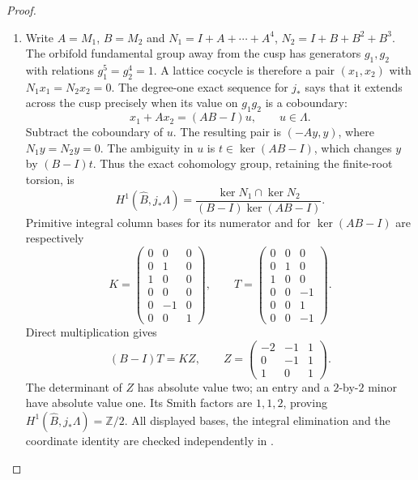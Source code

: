 \documentclass[11pt,a4paper]{article}
\theoremstyle{definition}
\begin{document}
\begin{proof}
\begin{enumerate}[label=\arabic*.]
To check the last surjectivity at the cusp, lift a translation
to the toroidal cover. It preserves the fan precisely when
its valuation is an integral translation of the periodic
fan. Subtract the corresponding period; the remaining
characters are nonvanishing holomorphic functions on a
disc and possess logarithms. These give a local section
of $E_0$. The kernel consists exactly of the invariant
integral periods. This also proves that the sequence
accounts for all extendable translations, including
possible component permutations.

\item Write $A=M_1$, $B=M_2$ and
$N_1=I+A+\cdots+A^4$, $N_2=I+B+B^2+B^3$.
The orbifold fundamental group away from the cusp has generators
$g_1,g_2$ with relations $g_1^5=g_2^4=1$.  A lattice cocycle is
therefore a pair $(x_1,x_2)$ with $N_1x_1=N_2x_2=0$.
The degree-one exact sequence for $j_*$ says that it extends across
the cusp precisely when its value on $g_1g_2$ is a coboundary:
\[
x_1+Ax_2=(AB-I)u,\qquad u\in\Lambda.
\]
Subtract the coboundary of $u$.  The resulting pair is $(-Ay,y)$,
where $N_1y=N_2y=0$.  The ambiguity in $u$ is
$t\in\ker(AB-I)$, which changes $y$ by $(B-I)t$.
Thus the exact cohomology group, retaining the finite-root torsion, is
\[
H^1(\widehat B,j_*\Lambda)=
\frac{\ker N_1\cap\ker N_2}{(B-I)\ker(AB-I)}.
\]
Primitive integral column bases for its numerator and for
$\ker(AB-I)$ are respectively
\[
K=\begin{pmatrix}
0&0&0\\0&1&0\\1&0&0\\0&0&0\\0&-1&0\\0&0&1
\end{pmatrix},\qquad
T=\begin{pmatrix}
0&0&0\\0&1&0\\1&0&0\\0&0&-1\\0&0&1\\0&0&-1
\end{pmatrix}.
\]
Direct multiplication gives
\[
(B-I)T=KZ,\qquad
Z=\begin{pmatrix}-2&-1&1\\0&-1&1\\1&0&1\end{pmatrix}.
\]
The determinant of $Z$ has absolute value two; an entry and a
$2$-by-$2$ minor have absolute value one.  Its Smith factors are
$1,1,2$, proving $H^1(\widehat B,j_*\Lambda)=\mathbb Z/2$.
All displayed bases, the integral elimination and the coordinate
identity are checked independently in
.


\end{enumerate}
\end{proof}
\end{document}
